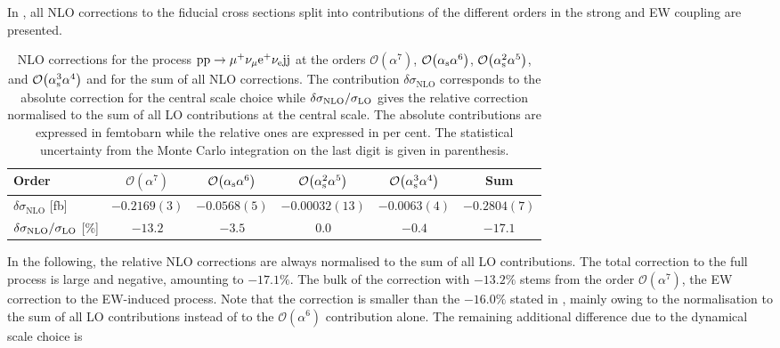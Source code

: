\documentclass[a4article,11pt]{article}
\begin{document}
In , all NLO corrections to the
fiducial cross sections split into contributions of the 
different orders in the strong and EW coupling are presented. 
%
\begin{table}
\begin{center}
\begin{tabular}{|l||c|c|c|c||c|}
\hline
Order & $\mathcal{O}{\left(\alpha^{7}\right)}$ & $\mathcal{O}{\left(\alpha_\text{s}\alpha^{6}\right)}$ & $\mathcal{O}{\left(\alpha_\text{s}^{2}\alpha^{5}\right)}$ & $\mathcal{O}{\left(\alpha_\text{s}^{3}\alpha^{4}\right)}$ & Sum \\
\hline
\hline 
${\delta \sigma_{\mathrm{NLO}}}$ [fb] 
& $-0.2169(3)$ 
& $-0.0568(5)$
& $-0.00032(13)$
& $-0.0063(4)$ 
& $-0.2804(7)$ \\
\hline
$\delta \sigma_{\mathrm{NLO}}/\sigma_{\rm LO}$ [\%] & $-13.2$ & $-3.5$ & $0.0$ & $-0.4$ & $-17.1$ \\
\hline
\end{tabular}
\end{center}
\caption{
NLO corrections for the process $\text{p}\text{p}\to\mu^+\nu_\mu\text{e}^+\nu_{\text{e}}\text{j}\text{j}$ at the orders 
$\mathcal{O}{\left(\alpha^{7}\right)}$, $\mathcal{O}{\left(\alpha_\text{s}\alpha^{6}\right)}$, $\mathcal{O}{\left(\alpha_\text{s}^{2}\alpha^{5}\right)}$, and $\mathcal{O}{\left(\alpha_\text{s}^{3}\alpha^{4}\right)}$ and for the sum of all NLO corrections.
The contribution $\delta\sigma_{\mathrm{NLO}}$ corresponds to the absolute correction for the central scale choice while $\delta \sigma_{\mathrm{NLO}}/\sigma_{\rm LO}$ gives the relative correction normalised to the sum of all LO contributions at the central scale.
The absolute contributions are expressed in femtobarn while the relative ones are expressed in per cent.
The statistical uncertainty from the Monte Carlo integration on the last digit is given in parenthesis.}
\label{table:NLOcrosssection}
\end{table}
%
In the following, the relative NLO corrections are always normalised
to the sum of all LO contributions.  The total correction to the full
process is large and negative, amounting to $-17.1\%$.  
The bulk
of the correction with $-13.2\%$ stems from the order
$\mathcal{O}{\left(\alpha^{7}\right)}$, the EW correction to the EW-induced
process.  Note that the correction is smaller than the $-16.0\%$
stated in , mainly owing to the
normalisation to the sum of all LO contributions instead of to the
$\mathcal{O}{\left(\alpha^{6}\right)}$ contribution alone. The
remaining additional difference due to the dynamical scale choice is
\end{document}
